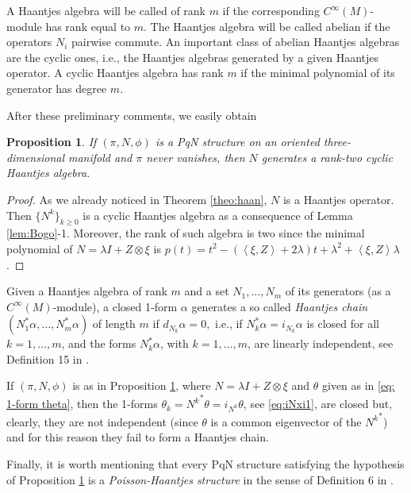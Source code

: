 \documentclass[12pt]{article}
\newtheorem{prop}[theorem]{Proposition}
\newcommand{\blu}[1]{\textcolor{blue}{#1}}
\begin{document}
A Haantjes algebra will be called of rank $m$ if the corresponding $C^\infty(M)$-module has rank equal to $m$. The Haantjes algebra will be called abelian if the operators $N_i$ %
pairwise commute. An important class of abelian Haantjes algebras are the cyclic ones, i.e., the Haantjes algebras generated by a given Haantjes operator. A cyclic Haantjes algebra has rank $m$ if the minimal polynomial of its generator has degree $m$. 

After these preliminary comments, we easily obtain %
\begin{prop}\label{pro:TTpqn}
If $(\pi,N,\phi)$ is a PqN structure on an oriented three-dimensional manifold and $\pi$ never vanishes, 
then $N$ generates a rank-two %
cyclic Haantjes algebra.
\end{prop}

\begin{proof}
As we already noticed in Theorem \ref{theo:haan}, $N$ is a Haantjes operator.  Then $\lbrace N^k\rbrace_{k\geq 0}$ is a cyclic Haantjes algebra as a consequence of Lemma \ref{lem:Bogo}-1. Moreover, the rank of such algebra is two since the minimal polynomial of $N=\lambda I+Z\otimes\xi$ is  $p(t)=t^2-(\left<\xi,Z\right>+2\lambda)t+\lambda^2+\left<\xi,Z\right>\lambda$.
\end{proof}

Given a Haantjes algebra of rank $m$ and a set $N_1,\dots,N_m$ of its generators (as a $C^\infty(M)$-module), a closed 1-form $\alpha$ generates a so called \emph{Haantjes chain} $(N_1^\ast\alpha,\dots,N_m^\ast\alpha)$ of length $m$ if
$
d_{N_k}\alpha=0,
$
i.e., if $N^\ast_k\alpha=i_{N_k}\alpha$ is closed for all $k=1,\dots,m$, and the forms $N_k^\ast\alpha$, with $k=1,\dots,m$, are linearly independent, see Definition 15 in \cite{tempestatondoclass}.

If $(\pi,N,\phi)$ is as in Proposition \ref{pro:TTpqn}, where $N=\lambda I+Z\otimes\xi$ 
and $\theta$ given as in \eqref{eq: 1-form theta},
then the 1-forms 
$\theta_k={N^k}^{\ast}\theta=i_{N^k}\theta$, 
see \eqref{eq:iNxi1}, are closed but, clearly, they are not independent (since %
$\theta$ is a common eigenvector of the ${N^k}^\ast$) and for this reason they fail to form a Haantjes chain.

Finally, it is worth mentioning that every PqN structure satisfying the hypothesis of Proposition \ref{pro:TTpqn} is a \emph{Poisson-Haantjes structure} in the sense of Definition 6 in \cite{TondoLag}.
\end{document}
